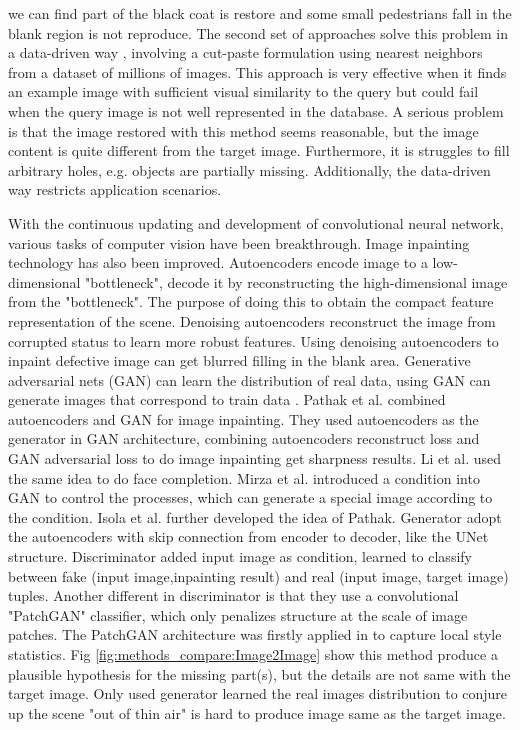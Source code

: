 \documentclass{IEEE_lsens}
\begin{document}
we can find part of the black coat is restore and some small pedestrians fall in the blank region is not reproduce. The second set of approaches solve this problem in a data-driven way \cite{Hays2007::Scene}, involving a cut-paste formulation using nearest neighbors from a dataset of millions of images. This approach is very effective when it finds an example image with sufficient visual similarity to the query but could fail when the query image is not well represented in the database. A serious problem is that the image restored with this method seems reasonable, but the image content is quite different from the target image. Furthermore, it is struggles to fill arbitrary holes, e.g. objects are partially missing. Additionally, the data-driven way restricts application scenarios.

\IEEEpubidadjcol
With the continuous updating and development of convolutional neural network, various tasks of computer vision have been breakthrough. Image inpainting technology has also been improved. Autoencoders \cite{Hinton2006:s:Reducing,Bengio:Co:Learning} encode image to a low-dimensional "bottleneck", decode it by reconstructing the high-dimensional image from the "bottleneck". The purpose of doing this to obtain the compact feature representation of the scene. Denoising autoencoders \cite{Vincent2008::Extracting} reconstruct the image from corrupted status to learn more robust features. Using  denoising autoencoders to inpaint defective image can get blurred filling in the blank area. Generative adversarial nets \cite{Goodfellow2014::Generative} (GAN) can learn the distribution of real data, using GAN can generate images that correspond to train data \cite{Radford2016::Unsupervised}. Pathak et al. \cite{Pathak2016::Context} combined autoencoders and GAN for image inpainting. They used autoencoders as the generator in GAN architecture, combining autoencoders reconstruct loss and GAN adversarial loss to do image inpainting get sharpness results. Li et al. \cite{Li2017::Generative} used the same idea to do face completion. Mirza et al. \cite{Mirza2014:CS:Conditional} introduced a condition into GAN to 
control the processes, which can generate a special image according to the condition. Isola et al. \cite{Isola2017::Image} further developed the idea of Pathak. Generator adopt the autoencoders with skip connection from encoder to decoder, like the UNet \cite{Ronneberger2015::U} structure. Discriminator added input image as condition, learned to classify between fake (input image,inpainting result) and real (input image, target image) tuples. Another different in discriminator is that they use a convolutional "PatchGAN" classifier, which only penalizes structure at the scale of image patches. The PatchGAN architecture was firstly applied in \cite{Li2016::Precomputed} to capture local style statistics. Fig \ref{fig:methods_compare:Image2Image} show this method produce a plausible hypothesis for the missing part(s), but the details are not same with the target image. Only used generator learned the real images distribution to conjure up the scene "out of thin air" is hard to produce image same as the target image. 
\end{document}
